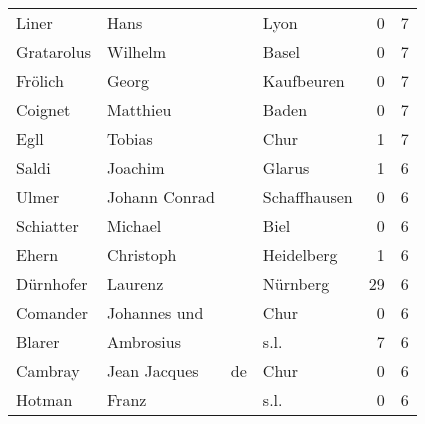 \begin{tabular}{llllrr}
                    Liner &                               Hans &             &                                        Lyon &          0 &         7 \\
               Gratarolus &                            Wilhelm &             &                                       Basel &          0 &         7 \\
                  Frölich &                              Georg &             &                                  Kaufbeuren &          0 &         7 \\
                  Coignet &                           Matthieu &             &                                       Baden &          0 &         7 \\
                     Egll &                             Tobias &             &                                        Chur &          1 &         7 \\
                    Saldi &                            Joachim &             &                                      Glarus &          1 &         6 \\
                    Ulmer &                      Johann Conrad &             &                                Schaffhausen &          0 &         6 \\
                Schiatter &                            Michael &             &                                        Biel &          0 &         6 \\
                    Ehern &                          Christoph &             &                                  Heidelberg &          1 &         6 \\
                Dürnhofer &                            Laurenz &             &                                    Nürnberg &         29 &         6 \\
                 Comander &                       Johannes und &             &                                        Chur &          0 &         6 \\
                   Blarer &                          Ambrosius &             &                                        s.l. &          7 &         6 \\
                  Cambray &                       Jean Jacques &          de &                                        Chur &          0 &         6 \\
                   Hotman &                              Franz &             &                                        s.l. &          0 &         6 \\

\end{tabular}
